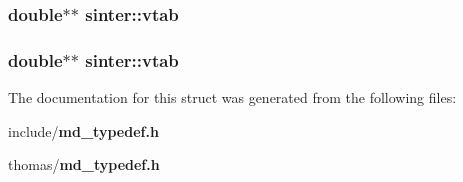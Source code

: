 \subsubsection{\setlength{\rightskip}{0pt plus 5cm}double$\ast$$\ast$ {\bf sinter::vtab}}\label{structsinter_7d470f1986a438084c2e6e43da5fa31f}


\subsubsection{\setlength{\rightskip}{0pt plus 5cm}double$\ast$$\ast$ {\bf sinter::vtab}}\label{structsinter_7d470f1986a438084c2e6e43da5fa31f}




The documentation for this struct was generated from the following files:\begin{CompactItemize}
\item 
include/{\bf md\_\-typedef.h}\item 
thomas/{\bf md\_\-typedef.h}\end{CompactItemize}
